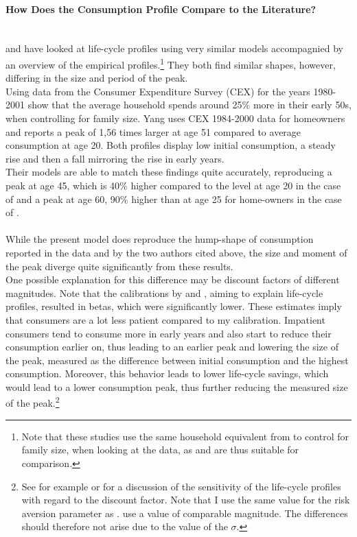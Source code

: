 \documentclass[a4paper,12pt,legno]{article}
\newcommand{\myparagraph}[1]{\paragraph{#1}\mbox{}\\}
\begin{document}
\myparagraph{How Does the Consumption Profile Compare to the Literature?} \cite{FV&K2011} and \cite{yang2009} have looked at life-cycle profiles using very similar models accompagnied by an overview of the empirical profiles.\footnote{Note that these studies use the same household equivalent from \cite{fernandez2007consumption} to control for family size, when looking at the data, as \cite{hintermaier2011} and are thus suitable for comparison.} They both find similar shapes, however, differing in the size and period of the peak.\\
Using data from the Consumer Expenditure Survey (CEX) for the years 1980-2001 \cite{FV&K2011} show that the average household spends around 25\% more in their early 50s, when controlling for family size. Yang uses CEX 1984-2000 data for homeowners and reports a peak of 1,56 times larger at age 51 compared to average consumption at age 20. Both profiles display low initial consumption, a steady rise and then a fall mirroring the rise in early years. \\
Their models are able to match these findings quite accurately, reproducing a peak  at age 45, which is 40\% higher compared to the level at age 20 in the case of \cite{FV&K2011} and a peak at age 60, 90\% higher than at age 25 for home-owners in the case of \cite{yang2009}. 
\\ \\
While the present model does reproduce the hump-shape of consumption reported in the data and by the two authors cited above, the size and moment of the peak diverge quite significantly from these results. \\
One possible explanation for this difference may be discount factors of different magnitudes. Note that the calibrations by \cite{FV&K2011} and  \cite{yang2009}, aiming to explain life-cycle profiles, resulted in betas, which were significantly lower. These estimates imply that consumers are a lot less patient compared to my calibration. Impatient consumers tend to consume more in early years and also start to reduce their consumption earlier on, thus leading to an earlier peak and lowering the size of the peak, measured as the difference between initial consumption and the highest consumption. Moreover, this behavior leads to lower life-cycle savings, which would lead to a lower consumption peak, thus further reducing the measured size of the peak.\footnote{See for example \cite{Gourinchas&Parker2002} or \cite{cagetti2003} for a discussion of the sensitivity of the life-cycle profiles with regard to the discount factor. Note that I use the same value for the risk aversion parameter as \cite{yang2009}. \cite{FV&K2011} use a value of comparable magnitude. The differences should therefore not arise due to the value of the $\sigma$.}
\end{document}

